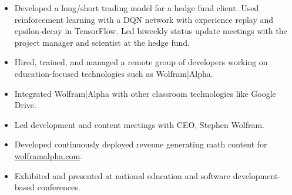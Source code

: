 \documentclass[11pt,a4paper,unicode]{moderncv}
\begin{document}
\vspace{-.1cm}
\cvline{}
{\begin{itemize} 
	  \item Developed a long/short trading model for a hedge fund client. Used reinforcement learning with a DQN network with experience replay and epsilon-decay in TensorFlow. 
		  Led biweekly status update meetings with the project manager and scientist at the hedge fund.
\end{itemize}}
\vspace{-.5cm}


\vspace{-.1cm}
\cvline{}
{\begin{itemize} 
	  \item Hired, trained, and managed a remote group of developers working on education-focused technologies such as Wolfram|Alpha. 
	  \item Integrated Wolfram|Alpha with other classroom technologies like Google Drive.
	  \item Led development and content meetings with CEO, Stephen Wolfram.
 \end{itemize}}
\vspace{-.5cm}


\vspace{-.1cm}
\cvline{}
{\begin{itemize} 
	\item Developed continuously deployed revenue generating math content for \url{wolframalpha.com}.
	\item Exhibited and presented at national education and software development-based conferences.
\end{itemize}}
\vspace{-.5cm}
\end{document}

